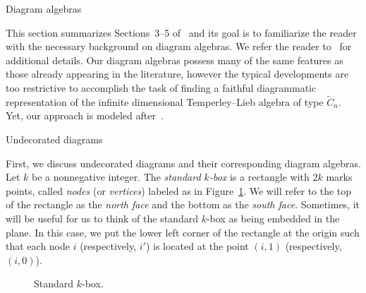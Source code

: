 \documentclass[11pt]{amsart}
\theoremstyle{definition}
\numberwithin{equation}{section}
\newcommand{\C}{\widetilde{C}}
\newcommand{\x}{\mathsf{x}}
\renewcommand{\(}{\left(}
\renewcommand{\)}{\right)}
\begin{document}
\begin{section}{Diagram algebras}\label{sec:diagram algebras}

This section summarizes Sections~3--5 of~\cite{Ernst2012} and its goal is to familiarize the reader with the necessary background on diagram algebras.  We refer the reader to~\cite{Ernst2008,Ernst2012} for additional details.  Our diagram algebras possess many of the same features as those already appearing in the literature, however the typical developments are too restrictive to accomplish the task of finding a faithful diagrammatic representation of the infinite dimensional Temperley--Lieb algebra of type $\C_n$.  Yet, our approach is modeled after~\cite{Green2003,Green2012,Jones1999,Martin2007}.


\begin{subsection}{Undecorated diagrams}

First, we discuss undecorated diagrams and their corresponding diagram algebras. Let $k$ be a nonnegative integer.  The \emph{standard $k$-box} is a rectangle with $2k$ marks points, called \emph{nodes} (or \emph{vertices}) labeled as in Figure~\ref{fig:k-box}.  We will refer to the top of the rectangle as the \emph{north face} and the bottom as the \emph{south face}.  Sometimes, it will be useful for us to think of the standard $k$-box as being embedded in the plane.  In this case, we put the lower left corner of the rectangle at the origin such that each node $i$ (respectively, $i'$) is located at the point $(i,1)$ (respectively, $(i,0)$).

\begin{figure}[!ht]
\centering
{}
\caption{Standard $k$-box.}\label{fig:k-box}
\end{figure}


\end{subsection}
\end{section}
\end{document}
